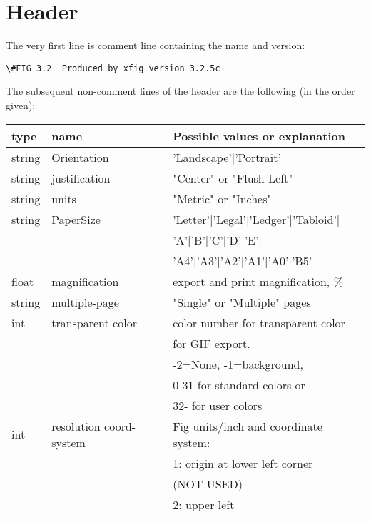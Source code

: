 \documentclass[10pt, a4paper]{article}
\begin{document}
\section{Header}\label{sec:header}

The very first line is comment line containing the name and version: 
%
\begin{verbatim}
\#FIG 3.2  Produced by xfig version 3.2.5c 
\end{verbatim}


The subsequent non-comment lines of the header are the following 
(in the order given): \\
%
\begin{tabular}{|lll|}
\hline
type & name & Possible values or explanation \\
\hline
\hline
string & Orientation             & 'Landscape'|'Portrait' \\
string & justification           & "Center" or "Flush Left" \\
string & units                   & "Metric" or "Inches" \\
string & PaperSize               & 'Letter'|'Legal'|'Ledger'|'Tabloid'|\\
&&                                 'A'|'B'|'C'|'D'|'E'|\\
&&                                 'A4'|'A3'|'A2'|'A1'|'A0'|'B5' \\
float  & magnification           & export and print magnification, \% \\
string & multiple-page           & "Single" or "Multiple" pages \\
int    & transparent color       & color number for transparent color \\
&&                                 for GIF export. \\
&&                                -2=None, -1=background, \\
&&                                0-31 for standard colors or \\
&&                                32- for user colors \\
int    & resolution coord-system & Fig units/inch and coordinate system:\\
&&                                 1: origin at lower left corner \\
&&                                    (NOT USED)\\
&&                                 2: upper left \\
\hline
\end{tabular}
\end{document}
